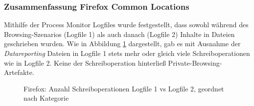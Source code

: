 \begin{appendices}
\subsubsection*{Zusammenfassung Firefox Common Locations}
Mithilfe der Process Monitor Logfiles wurde festgestellt, dass sowohl während des Browsing-Szenarios (Logfile 1) als auch danach (Logfile 2) Inhalte in Dateien geschrieben wurden. Wie in Abbildung \ref{chart:firefox-writefile-logfile1v2} dargestellt, gab es mit Ausnahme der \textit{Datareporting} Dateien in Logfile 1 stets mehr oder gleich viele Schreiboperationen wie in Logfile 2. Keine der Schreiboperation hinterließ Private-Browsing-Artefakte.

\begin{figure}[h!]
	\caption{Firefox: Anzahl Schreiboperationen Logfile 1 vs Logfile 2, geordnet nach Kategorie}
	\label{chart:firefox-writefile-logfile1v2}
\end{figure}


\end{appendices}
